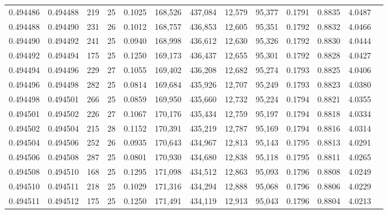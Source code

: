 \begin{tabular}{rrrrrrrrrrrrr}
0.494486 & 0.494488 & 219 &  25 &                                     0.1025 & 168,526 & 437,084 &  12,579 &  95,377 & 0.1791 & 0.8835 & 4.0487 \\
0.494488 & 0.494490 & 231 &  26 &                                     0.1012 & 168,757 & 436,853 &  12,605 &  95,351 & 0.1792 & 0.8832 & 4.0466 \\
0.494490 & 0.494492 & 241 &  25 &                                     0.0940 & 168,998 & 436,612 &  12,630 &  95,326 & 0.1792 & 0.8830 & 4.0444 \\
0.494492 & 0.494494 & 175 &  25 &                                     0.1250 & 169,173 & 436,437 &  12,655 &  95,301 & 0.1792 & 0.8828 & 4.0427 \\
0.494494 & 0.494496 & 229 &  27 &                                     0.1055 & 169,402 & 436,208 &  12,682 &  95,274 & 0.1793 & 0.8825 & 4.0406 \\
0.494496 & 0.494498 & 282 &  25 &                                     0.0814 & 169,684 & 435,926 &  12,707 &  95,249 & 0.1793 & 0.8823 & 4.0380 \\
0.494498 & 0.494501 & 266 &  25 &                                     0.0859 & 169,950 & 435,660 &  12,732 &  95,224 & 0.1794 & 0.8821 & 4.0355 \\
0.494501 & 0.494502 & 226 &  27 &                                     0.1067 & 170,176 & 435,434 &  12,759 &  95,197 & 0.1794 & 0.8818 & 4.0334 \\
0.494502 & 0.494504 & 215 &  28 &                                     0.1152 & 170,391 & 435,219 &  12,787 &  95,169 & 0.1794 & 0.8816 & 4.0314 \\
0.494504 & 0.494506 & 252 &  26 &                                     0.0935 & 170,643 & 434,967 &  12,813 &  95,143 & 0.1795 & 0.8813 & 4.0291 \\
0.494506 & 0.494508 & 287 &  25 &                                     0.0801 & 170,930 & 434,680 &  12,838 &  95,118 & 0.1795 & 0.8811 & 4.0265 \\
0.494508 & 0.494510 & 168 &  25 &                                     0.1295 & 171,098 & 434,512 &  12,863 &  95,093 & 0.1796 & 0.8808 & 4.0249 \\
0.494510 & 0.494511 & 218 &  25 &                                     0.1029 & 171,316 & 434,294 &  12,888 &  95,068 & 0.1796 & 0.8806 & 4.0229 \\
0.494511 & 0.494512 & 175 &  25 &                                     0.1250 & 171,491 & 434,119 &  12,913 &  95,043 & 0.1796 & 0.8804 & 4.0213 \\

\end{tabular}
